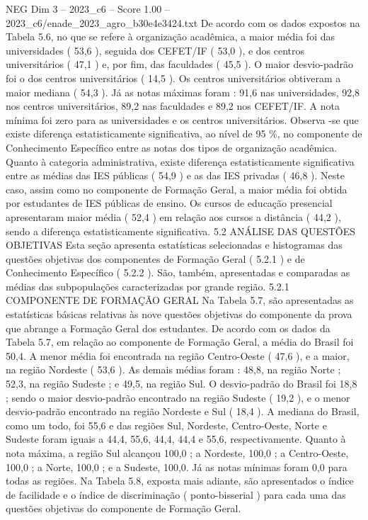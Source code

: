 \begin{textsample}{NEG Dim 3 – 2023\_c6 – Score 1.00 – 2023\_c6/enade\_2023\_agro\_b30e4e3424.txt}
De acordo com os dados expostos na Tabela 5.6, no que se refere à organização acadêmica, a maior média foi das universidades ( 53,6 ), seguida dos CEFET/IF ( 53,0 ), e dos centros universitários ( 47,1 ) e, por fim, das faculdades ( 45,5 ).
O maior desvio-padrão foi o dos centros universitários ( 14,5 ).
Os centros universitários obtiveram a maior mediana ( 54,3 ).
Já as notas máximas foram : 91,6 nas universidades, 92,8 nos centros universitários, 89,2 nas faculdades e 89,2 nos CEFET/IF.
A nota mínima foi zero para as universidades e os centros universitários.
Observa -se que existe diferença estatisticamente significativa, ao nível de 95 \%, no componente de Conhecimento Específico entre as notas dos tipos de organização acadêmica.
Quanto à categoria administrativa, existe diferença estatisticamente significativa entre as médias das IES públicas ( 54,9 ) e as das IES privadas ( 46,8 ).
Neste caso, assim como no componente de Formação Geral, a maior média foi obtida por estudantes de IES públicas de ensino.
Os cursos de educação presencial apresentaram maior média ( 52,4 ) em relação aos cursos a distância ( 44,2 ), sendo a diferença estatisticamente significativa. 5.2 ANÁLISE DAS QUESTÕES OBJETIVAS Esta seção apresenta estatísticas selecionadas e histogramas das questões objetivas dos componentes de Formação Geral ( 5.2.1 ) e de Conhecimento Específico ( 5.2.2 ).
São, também, apresentadas e comparadas as médias das subpopulações caracterizadas por grande região. 5.2.1 COMPONENTE DE FORMAÇÃO GERAL Na Tabela 5.7, são apresentadas as estatísticas básicas relativas às nove questões objetivas do componente da prova que abrange a Formação Geral dos estudantes.
De acordo com os dados da Tabela 5.7, em relação ao componente de Formação Geral, a média do Brasil foi 50,4.
A menor média foi encontrada na região Centro-Oeste ( 47,6 ), e a maior, na região Nordeste ( 53,6 ).
As demais médias foram : 48,8, na região Norte ; 52,3, na região Sudeste ; e 49,5, na região Sul.
O desvio-padrão do Brasil foi 18,8 ; sendo o maior desvio-padrão encontrado na região Sudeste ( 19,2 ), e o menor desvio-padrão encontrado na região Nordeste e Sul ( 18,4 ).
A mediana do Brasil, como um todo, foi 55,6 e das regiões Sul, Nordeste, Centro-Oeste, Norte e Sudeste foram iguais a 44,4, 55,6, 44,4, 44,4 e 55,6, respectivamente.
Quanto à nota máxima, a região Sul alcançou 100,0 ; a Nordeste, 100,0 ; a Centro-Oeste, 100,0 ; a Norte, 100,0 ; e a Sudeste, 100,0.
Já as notas mínimas foram 0,0 para todas as regiões.
Na Tabela 5.8, exposta mais adiante, são apresentados o índice de facilidade e o índice de discriminação ( ponto-bisserial ) para cada uma das questões objetivas do componente de Formação Geral.

\end{textsample}
